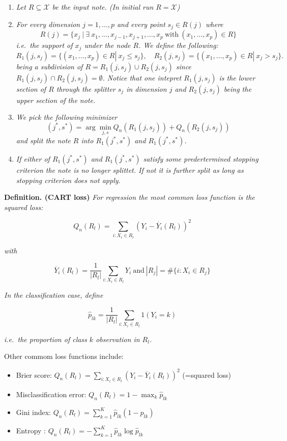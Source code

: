 \documentclass[
]{book}
\providecommand{\tightlist}{%
  \setlength{\itemsep}{0pt}\setlength{\parskip}{0pt}}
\begin{document}
\begin{enumerate}
\def\labelenumi{\arabic{enumi})}
\tightlist
\item
  \emph{Let \(R\subseteq \mathcal X\) be the input note. (In initial run \(R=\mathcal X\))}
\item
  \emph{For every dimension \(j=1,\dots,p\) and every point \(s_j\in R(j)\) where}
  \[R(j)= \{x_j\ |\     \exists\ x_1,\dots,x_{j-1},x_{j+1},\dots,x_p\ \text{with}\ (x_1,\dots,x_p)\in R\}\]
  \emph{i.e.~the support of \(x_j\) under the node \(R\). We define the following:}
  \[R_1(j,s_j)=\{(x_1,\dots,x_p)\in R| \ x_j \leq s_j\}, \quad R_2(j,s_j)=\{(x_1,\dots,x_p)\in R| \ x_j > s_j\}.\]
  \emph{being a subdivision of \(R=R_1(j,s_j)\cup R_2(j,s_j)\) since \(R_1(j,s_j)\cap R_2(j,s_j)=\emptyset\). Notice that one intepret \(R_1(j,s_j)\) is the lower section of \(R\) through the splitter \(s_j\) in dimension \(j\) and \(R_2(j,s_j)\) being the upper section of the note.}
\item
  \emph{We pick the following minimizer}
  \[(j^\ast,s^\ast)= \arg\min_{j,s} Q_n(R_1(j,s_j)) + Q_n(R_2(j,s_j))\]
  \emph{and split the note \(R\) into \(R_1(j^*,s^*)\) and \(R_1(j^*,s^*)\).}
\item
  \emph{If either of \(R_1(j^*,s^*)\) and \(R_1(j^*,s^*)\) satisfy some predertermined stopping criterion the note is no longer splittet. If not it is further split as long as stopping criterion does not apply.}
\end{enumerate}

\textbf{Definition. (CART loss)} \emph{For regression the most common loss function is the squared loss:}

\[
Q_n(R_l)= \sum_{i: X_i \in R_l} (Y_i - \overline Y_i(R_l))^2
\]

\emph{with}

\[
\overline Y_i(R_l)= \frac 1 {|R_l|}\sum_{i: X_i \in R_l}Y_i\ \text{and}\ |R_j|=\#\{i: X_i\in R_j\}
\]

\emph{In the classification case, define}

\[
\hat p_{lk}= \frac 1 {|R_l|} \sum_{i: X_i \in R_l}   1(Y_i=k)
\]

\emph{i.e.~the proportion of class \(k\) observation in \(R_l\).}

Other commom loss functions include:

\begin{itemize}
\tightlist
\item
  Brier score: \(Q_n(R_l)= \sum_{i: X_i \in R_l} (Y_i - \overline Y_i(R_l))^2\) (=squared loss)
\item
  Misclassification error: \(Q_n(R_l)= 1 - \max_{k}\hat p_{lk}\)
\item
  Gini index: \(Q_n(R_l)= \sum_{k=1}^K \hat p_{lk}(1-\hat p_{lk})\)
\item
  Entropy : \(Q_n(R_l)=-\sum_{k=1}^K \hat p_{lk}\log\hat p_{lk}\)
\end{itemize}
\end{document}
